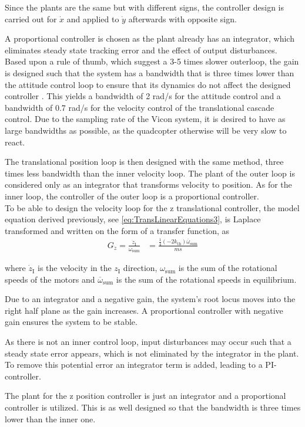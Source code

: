 Since the plants are the same but with different signs, the controller design is carried out for $\dot{x}$ and applied to $\dot{y}$ afterwards with opposite sign.

A proportional controller is chosen as the plant already has an integrator, which eliminates steady state tracking error and the effect of output disturbances. Based upon a rule of thumb, which suggest a 3-5 times slower outerloop, the gain is designed such that the system has a bandwidth that is three times lower than the attitude control loop to ensure that its dynamics do not affect the designed controller . This yields a bandwidth of 2 rad/s for the attitude control and a bandwidth of 0.7 rad/s for the velocity control of the translational cascade control. Due to the sampling rate of the Vicon system, it is desired to have as large bandwidths as possible, as the quadcopter otherwise will be very slow to react.   

The translational position loop is then designed with the same method, three times less bandwidth than the inner velocity loop. The plant of the outer loop is considered only as an integrator that transforms velocity to position. As for the inner loop, the controller of the outer loop is a proportional controller. \\

To be able to design the velocity loop for the z translational controller, the model equation derived previously, see \eqref{eq:TransLinearEquations3}, is Laplace transformed and written on the form of a transfer function, as
%
\vspace{-.1cm}
\begin{align}
G_{\dot{z}}=\frac{\dot{z}_{\mathrm{I}}}{\omega_{\mathrm{sum}}} &= \frac{ \frac{1}{4}(-2 k_{\mathrm{th}})\overline{\omega}_{\mathrm{sum}} }{ m s }\label{eq:linearTransferFunctionZ}
\end{align}

\noindent where $\dot{z}_\mathrm{I}$ is the velocity in the $z_{\mathrm{I}}$ direction, $\omega_{\mathrm{sum}}$ is the sum of the rotational speeds of the motors and $\overline{\omega}_{\mathrm{sum}}$ is the sum of the rotational speeds in equilibrium.

Due to an integrator and a negative gain, the system's root locus moves into the right half plane as the gain increases. A proportional controller with negative gain ensures the system to be stable. 

As there is not an inner control loop, input disturbances may occur such that a steady state error appears, which is not eliminated by the integrator in the plant. To remove this potential error an integrator term is added, leading to a PI-controller. 

The plant for the z position controller is just an integrator and a proportional controller is utilized. This is as well designed so that the bandwidth is three times lower than the inner one.
